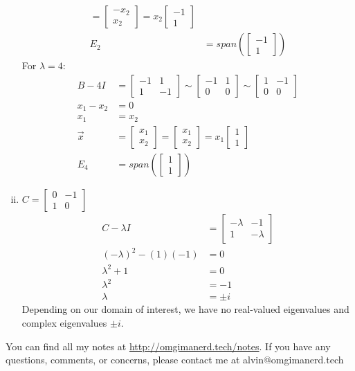 \documentclass{math}
\begin{document}
\begin{enumerate}[(i)]
\begin{align*}
      = \begin{bmatrix}-x_2 \\ x_2\end{bmatrix}
      = x_2\begin{bmatrix}-1 \\ 1\end{bmatrix} \\
    E_2 &= span\left(\begin{bmatrix}-1 \\ 1\end{bmatrix}\right)
  \end{align*}
  For \( \lambda = 4 \):
  \begin{align*}
    B-4I &= \begin{bmatrix}-1 & 1 \\ 1 & -1\end{bmatrix}
      \sim \begin{bmatrix}-1 & 1 \\ 0 & 0\end{bmatrix}
      \sim \begin{bmatrix}1 & -1 \\ 0 & 0\end{bmatrix} \\
    x_1-x_2 &= 0 \\
    x_1 &= x_2 \\
    \vec{x} &= \begin{bmatrix}x_1 \\ x_2\end{bmatrix}
      = \begin{bmatrix}x_1 \\ x_2\end{bmatrix}
      = x_1\begin{bmatrix}1 \\ 1\end{bmatrix} \\
    E_4 &= span\left(\begin{bmatrix}1 \\ 1\end{bmatrix}\right)
  \end{align*}
  \item \( C = \begin{bmatrix}0 & -1 \\ 1 & 0\end{bmatrix} \)
  \begin{align*}
    C-\lambda I &= \begin{bmatrix}
      -\lambda & -1 \\
      1 & -\lambda
    \end{bmatrix} \\
    (-\lambda)^2-(1)(-1) &= 0 \\
    \lambda^2+1 &= 0 \\
    \lambda^2 &= -1 \\
    \lambda &= \pm i
  \end{align*}
  Depending on our domain of interest, we have no real-valued eigenvalues and
  complex eigenvalues \( \pm i \).
\end{enumerate}

\begin{center}
  You can find all my notes at \url{http://omgimanerd.tech/notes}. If you have
  any questions, comments, or concerns, please contact me at
  alvin@omgimanerd.tech
\end{center}
\end{document}

